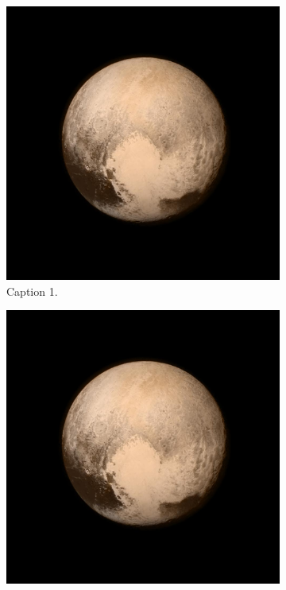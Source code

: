 \begin{figure}[htb!]
\center
\begin{subfigure}{0.67\linewidth}
\includegraphics[width=\textwidth]{figures/PIA19708-orig.jpg}
\caption{Caption 1.}\label{fig3-a}
\end{subfigure}
\begin{subfigure}{0.35\linewidth}
\center
\includegraphics[width=\textwidth]{figures/PIA19708-orig.jpg}

\end{subfigure}
\end{figure}
